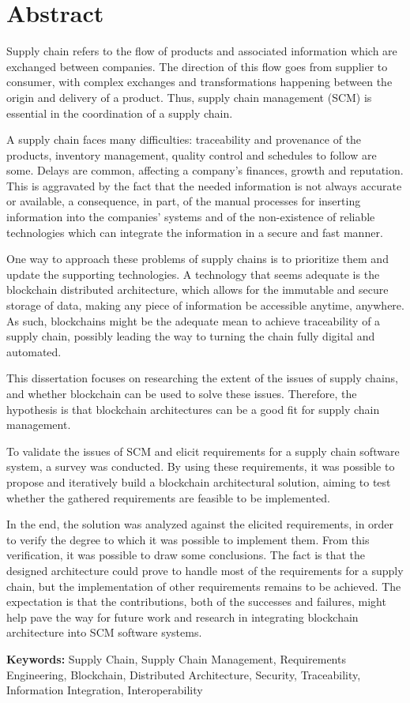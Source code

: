 \chapter{Abstract}
Supply chain refers to the flow of products and associated information which are exchanged between companies. The direction of this flow goes from supplier to consumer, with complex exchanges and transformations happening between the origin and delivery of a product. Thus, supply chain management (SCM) is essential in the coordination of a supply chain.

A supply chain faces many difficulties: traceability and provenance of the products, inventory management, quality control and schedules to follow are some.  Delays are common, affecting a company's finances, growth and reputation. This is aggravated by the fact that the needed information is not always accurate or available, a consequence, in part, of the manual processes for inserting information into the companies' systems and of the non-existence of reliable technologies which can integrate the information in a secure and fast manner.

One way to approach these problems of supply chains is to prioritize them and update the supporting technologies. A technology that seems adequate is the blockchain distributed architecture, which allows for the immutable and secure storage of data, making any piece of information be accessible anytime, anywhere. As such, blockchains might be the adequate mean to achieve traceability of a supply chain, possibly leading the way to turning the chain fully digital and automated.

This dissertation focuses on researching the extent of the issues of supply chains, and whether blockchain can be used to solve these issues. Therefore, the hypothesis is that blockchain architectures can be a good fit for supply chain management.

To validate the issues of SCM and elicit requirements for a supply chain software system, a survey was conducted. By using these requirements, it was possible to propose and iteratively build a blockchain architectural solution, aiming to test whether the gathered requirements are feasible to be implemented. 

In the end, the solution was analyzed against the elicited requirements, in order to verify the degree to which it was possible to implement them. From this verification, it was possible to draw some conclusions. The fact is that the designed architecture could prove to handle most of the requirements for a supply chain, but the implementation of other requirements remains to be achieved. The expectation is that the contributions, both of the successes and failures, might help pave the way for future work and research in integrating blockchain architecture into SCM software systems.

\textbf{Keywords:} Supply Chain, Supply Chain Management, Requirements Engineering, Blockchain, Distributed Architecture, Security, Traceability, Information Integration, Interoperability



